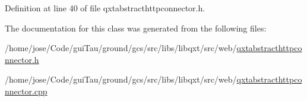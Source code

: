 Definition at line 40 of file qxtabstracthttpconnector.\-h.



The documentation for this class was generated from the following files\-:\begin{DoxyCompactItemize}
\item 
/home/jose/\-Code/gui\-Tau/ground/gcs/src/libs/libqxt/src/web/\hyperlink{qxtabstracthttpconnector_8h}{qxtabstracthttpconnector.\-h}\item 
/home/jose/\-Code/gui\-Tau/ground/gcs/src/libs/libqxt/src/web/\hyperlink{qxtabstracthttpconnector_8cpp}{qxtabstracthttpconnector.\-cpp}\end{DoxyCompactItemize}

